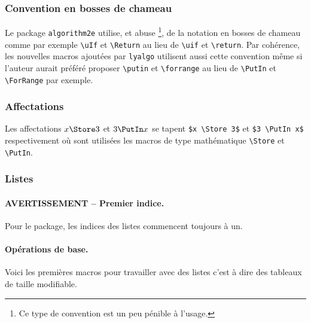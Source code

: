 \subsubsection{Convention en bosses de chameau}

Le package \verb+algorithm2e+ utilise, et abuse
\footnote{
	Ce type de convention est un peu pénible à l'usage.
},
de la notation en bosses de chameau comme par exemple \verb+\uIf+ et \verb+\Return+ au lieu de \verb+\uif+ et \verb+\return+.
Par cohérence, les nouvelles macros ajoutées par \verb+lyalgo+ utilisent aussi cette convention même si l'auteur aurait préféré proposer \verb+\putin+ et \verb+\forrange+ au lieu de \verb+\PutIn+ et \verb+\ForRange+ par exemple.




\subsubsection{Affectations}

Les affectations $x \Store 3$ et $3 \PutIn x$ se tapent \verb+$x \Store 3$+ et \verb+$3 \PutIn x$+ respectivement où sont utilisées les macros de type mathématique \verb+\Store+ et \verb+\PutIn+.




\subsubsection{Listes}

\paragraph{AVERTISSEMENT -- Premier indice.}\phantom{XX}\smallskip

Pour le package, les indices des listes commencent toujours à un.


\paragraph{Opérations de base.}\phantom{XX}\smallskip

Voici les premières macros pour travailler avec des listes c'est à dire des tableaux de taille modifiable.

